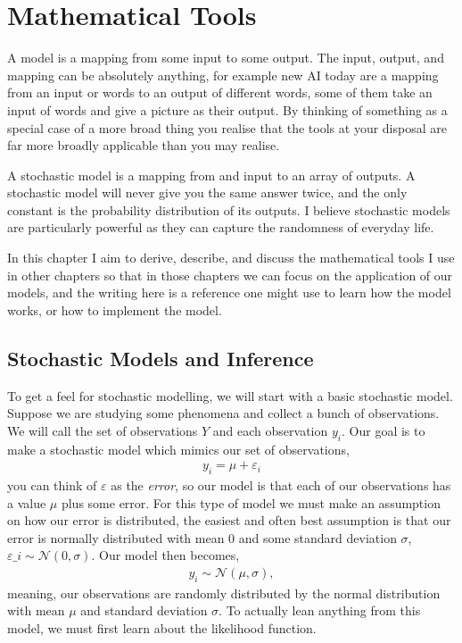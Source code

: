 \chapter{Mathematical Tools}
\label{chap: 1 Mathematical Tools}

A model is a mapping from some input to some output. The input, output, and mapping can be absolutely anything, for example new AI today are a mapping from an input or words to an output of different words, some of them take an input of words and give a picture as their output. By thinking of something as a special case of a more broad thing you realise that the tools at your disposal are far more broadly applicable than you may realise.

A stochastic model is a mapping from and input to an array of outputs. A stochastic model will never give you the same answer twice, and the only constant is the probability distribution of its outputs. I believe stochastic models are particularly powerful as they can capture the randomness of everyday life.

In this chapter I aim to derive, describe, and discuss the mathematical tools I use in other chapters so that in those chapters we can focus on the application of our models, and the writing here is a reference one might use to learn how the model works, or how to implement the model.

\section{Stochastic Models and Inference}

To get a feel for stochastic modelling, we will start with a basic stochastic model. Suppose we are studying some phenomena and collect a bunch of observations. We will call the set of observations $Y$ and each observation $y_i$. Our goal is to make a stochastic model which mimics our set of observations,
\begin{align*}
    y_i = \mu + \varepsilon_i
\end{align*}
you can think of $\varepsilon$ as the \textit{error}, so our model is that each of our observations has a value $\mu$ plus some error. For this type of model we must make an assumption on how our error is distributed, the easiest and often best assumption is that our error is normally distributed with mean 0 and some standard deviation $\sigma$, $\varepsilon\_i\sim\mathcal{N}(0,\sigma)$. Our model then becomes,
\begin{align*}
    y_i\sim\mathcal{N}(\mu,\sigma),
\end{align*}
meaning, our observations are randomly distributed by the normal distribution with mean $\mu$ and standard deviation $\sigma$. To actually lean anything from this model, we must first learn about the likelihood function.

